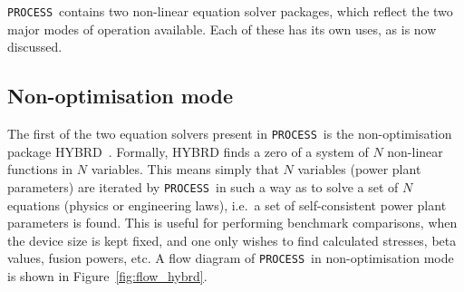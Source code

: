 \documentclass[11pt,a4paper]{report}
\newcommand{\process}{\mbox{\texttt{PROCESS}}}
\begin{document}
\process\ contains two non-linear equation solver packages, which reflect the
two major modes of operation available. Each of these has its own uses, as is
now discussed.

\subsection{Non-optimisation mode}

The first of the two equation solvers present in \process\ is the
non-optimisation package HYBRD~\cite{hybrd_anl,hybrd}. Formally, HYBRD
finds a zero of a system of $N$ non-linear functions in $N$ variables. This
means simply that $N$ variables (power plant parameters) are iterated by
\process\ in such a way as to solve a set of $N$ equations (physics or
engineering laws), i.e.\ a set of self-consistent power plant parameters is
found. This is useful for performing benchmark comparisons, when the device
size is kept fixed, and one only wishes to find calculated stresses, beta
values, fusion powers, etc. A flow diagram of \process\ in non-optimisation
mode is shown in Figure~\ref{fig:flow_hybrd}.


\setlength{\unitlength}{1mm}
\end{document}
